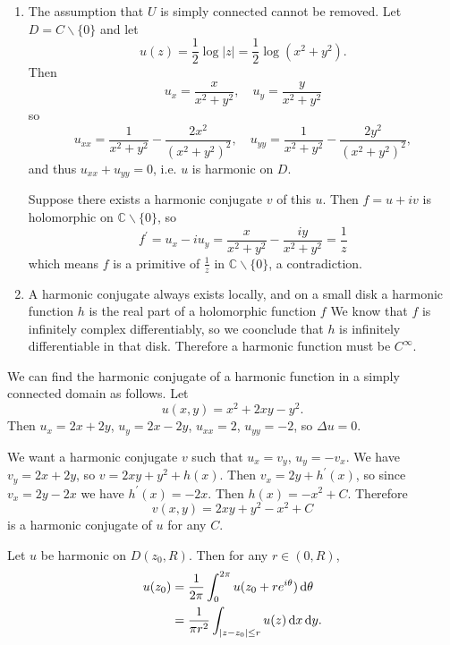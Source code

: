 \begin{remark}
\begin{enumerate}
  \item{
    The assumption that $U$ is simply connected cannot be removed.
    Let $D = C \backslash \{ 0 \}$ and let
    $$
    u(z) = \frac{1}{2} \log |z| = \frac{1}{2} \log (x^2 + y^2).
    $$
    Then
    $$
    u_x = \frac{x}{x^2 + y^2}, \quad
    u_y = \frac{y}{x^2 + y^2}
    $$
    so
    $$
    u_{xx} = \frac{1}{x^2 + y^2} - \frac{2 x^2}{(x^2 + y^2)^2}, \quad
    u_{yy} = \frac{1}{x^2 + y^2} - \frac{2 y^2}{(x^2 + y^2)^2},
    $$
    and thus $u_{xx} + u_{yy} = 0$, i.e. $u$ is harmonic on $D$.

    Suppose there exists a harmonic conjugate $v$ of this $u$.
    Then $f = u + iv$ is holomorphic on $\mathbb{C} \backslash \{ 0 \}$,
    so
    $$
      f^\prime
    = u_x - i u_y
    = \frac{x}{x^2 + y^2} - \frac{iy}{x^2 + y^2}
    = \frac{1}{z}
    $$
    which means $f$ is a primitive of $\frac{1}{z}$ in
    $\mathbb{C} \backslash \{ 0 \}$, a contradiction.
  }
  \item{
    A harmonic conjugate always exists locally, and on a small disk
    a harmonic function $h$ is the real part of a holomorphic function $f$
    We know that $f$ is infinitely complex differentiably, so we coonclude that
    $h$ is infinitely differentiable in that disk. Therefore a harmonic
    function must be $C^\infty$.
  }
\end{enumerate}
\end{remark}

We can find the harmonic conjugate of a harmonic function in a simply
connected domain as follows.
Let
$$
u(x, y) = x^2 + 2xy - y^2.
$$
Then $u_x = 2x + 2y$, $u_y = 2x - 2y$,
$u_{xx} = 2$, $u_{yy} = -2$, so $\Delta u = 0$.

We want a harmonic conjugate $v$ such that $u_x = v_y$,
$u_y = -v_x$. We have $v_y = 2x + 2y$, so
$v = 2xy + y^2 + h(x)$. Then
$v_x = 2y + h^\prime(x)$, so since $v_x = 2y - 2x$ we have
$h^\prime(x) = -2x$. Then $h(x) = -x^2 + C$. Therefore
$$
v(x, y) = 2xy + y^2 - x^2 + C
$$
is a harmonic conjugate of $u$ for any $C$.

\begin{theorem}
Let $u$ be harmonic on $D(z_0, R)$. Then for any $r \in (0, R)$,
\begin{align*}
   u(z_0)
&= \frac{1}{2 \pi}
   \int_0^{2 \pi}
     u(z_0 + r e^{i \theta})
     \mathop{}\!\mathrm{d} \theta \\
&= \frac{1}{\pi r^2}
   \int_{|z - z_0| \leq r}
     u(z)
     \mathop{}\!\mathrm{d} x \mathop{}\!\mathrm{d} y.
\end{align*}
\end{theorem}

